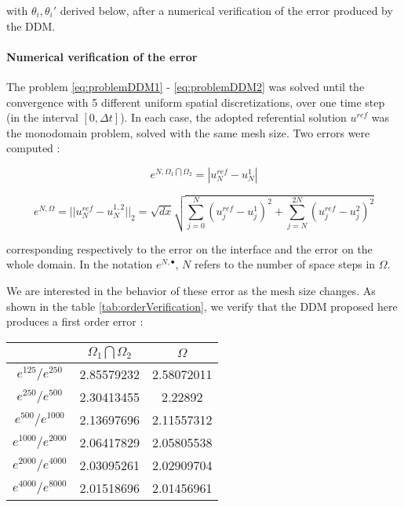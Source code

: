 \noindent with $\theta_i, \theta_i'$ derived below, after a numerical verification of the error produced by the DDM.

\paragraph{Numerical verification of the error}

\indent The problem \eqref{eq:problemDDM1} - \eqref{eq:problemDDM2} was solved until the convergence with 5 different uniform spatial discretizations, over one time step (in the interval $[0,\Delta t]$). In each case, the adopted referential solution $u^{ref}$ was the monodomain problem, solved with the same mesh size. Two errors were computed : 

\begin{equation}
	e^{N,\Omega_1\bigcap \Omega_2} = |u^{ref}_N - u^{1}_N|
\end{equation}

\begin{equation}
	e^{N,\Omega} = ||u^{ref}_N - u^{1,2}_N||_2 = \sqrt{dx}\sqrt{\sum_{j=0}^N{(u^{ref}_j - u^{1}_j)^2 } + \sum_{j=N}^{2N}{(u^{ref}_j - u^{2}_j)^2 } }
\end{equation}

\noindent corresponding respectively to the error on the interface and the error on the whole domain. In the notation $e^{N,\bullet}$, $N$ refers to the number of space steps in $\Omega$.

\indent We are interested in the behavior of these error as the mesh size changes. As shown in the table \ref{tab:orderVerification}, we verify that the DDM proposed here produces a first order error :

\begin{center}
	\begin{tabular}{c|S[round-precision=4]|S[round-precision=4]}
	  &  &  \\
	\hline
	$e^{125}/e^{250}$ & 2.85579232 & 2.58072011\\
	$e^{250}/e^{500}$ & 2.30413455 & 2.22892 \\
	$e^{500}/e^{1000}$ &  2.13697696 & 2.11557312 \\
	$e^{1000}/e^{2000}$ & 2.06417829 & 2.05805538\\
	$e^{2000}/e^{4000}$ & 2.03095261 & 2.02909704 \\
	$e^{4000}/e^{8000}$ & 2.01518696 & 2.01456961 \\
	\end{tabular}
\end{center}


